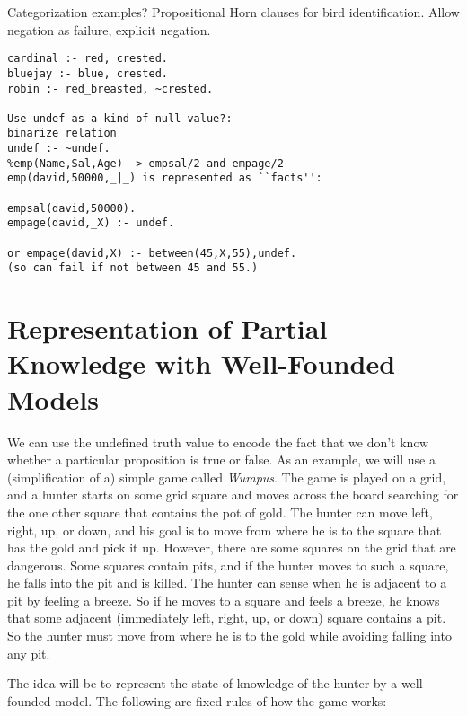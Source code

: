 Categorization examples?  Propositional Horn clauses for bird
identification.  Allow negation as failure, explicit negation.

\begin{verbatim}
cardinal :- red, crested.
bluejay :- blue, crested.
robin :- red_breasted, ~crested.

Use undef as a kind of null value?:
binarize relation
undef :- ~undef.
%emp(Name,Sal,Age) -> empsal/2 and empage/2
emp(david,50000,_|_) is represented as ``facts'':

empsal(david,50000).
empage(david,_X) :- undef.

or empage(david,X) :- between(45,X,55),undef.
(so can fail if not between 45 and 55.)
\end{verbatim}


\section{Representation of Partial Knowledge with Well-Founded Models}

We can use the undefined truth value to encode the fact that we don't
know whether a particular proposition is true or false.  As an
example, we will use a (simplification of a) simple game called {\em
Wumpus}.  The game is played on a grid, and a hunter starts on some
grid square and moves across the board searching for the one other
square that contains the pot of gold.  The hunter can move left,
right, up, or down, and his goal is to move from where he is to the
square that has the gold and pick it up.  However, there are some
squares on the grid that are dangerous.  Some squares contain pits,
and if the hunter moves to such a square, he falls into the pit and is
killed.  The hunter can sense when he is adjacent to a pit by feeling
a breeze.  So if he moves to a square and feels a breeze, he knows
that some adjacent (immediately left, right, up, or down) square
contains a pit.  So the hunter must move from where he is to the gold
while avoiding falling into any pit.

The idea will be to represent the state of knowledge of the hunter by
a well-founded model.  The following are fixed rules of how the game
works:

